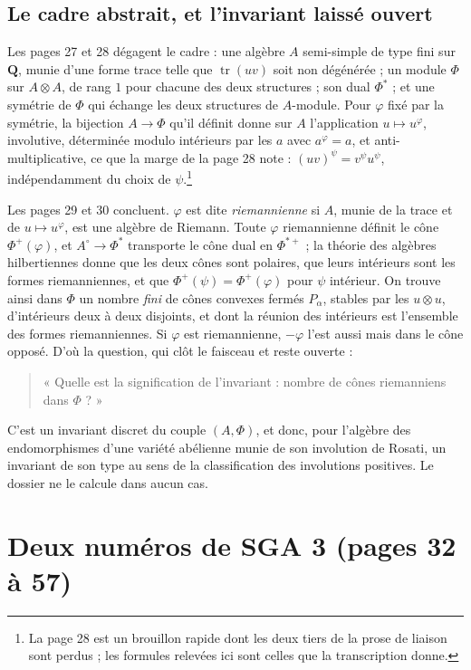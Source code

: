 \documentclass[11pt,a4paper]{article}
\begin{document}
\subsection*{Le cadre abstrait, et l'invariant laissé ouvert}

Les pages 27 et 28 dégagent le cadre : une algèbre $A$ semi-simple de type fini
sur $\mathbf{Q}$, munie d'une forme trace telle que $\operatorname{tr}(uv)$ soit
non dégénérée ; un module $\Phi$ sur $A \otimes A$, de rang $1$ pour chacune
des deux structures ; son dual $\Phi^{*}$ ; et une symétrie de $\Phi$ qui
échange les deux structures de $A$-module. Pour $\varphi$ fixé par la symétrie,
la bijection $A \to \Phi$ qu'il définit donne sur $A$ l'application $u \mapsto
u^{\varphi}$, involutive, déterminée modulo intérieurs par les $a$ avec
$a^{\varphi} = a$, et anti-multiplicative, ce que la marge de la page 28
note : $(uv)^{\psi} = v^{\psi}u^{\psi}$, indépendamment du choix de
$\psi$.\footnote{La page 28 est un brouillon rapide dont les deux tiers de la
prose de liaison sont perdus ; les formules relevées ici sont celles que la
transcription donne.}

Les pages 29 et 30 concluent. $\varphi$ est dite \emph{riemannienne} si $A$,
munie de la trace et de $u \mapsto u^{\varphi}$, est une algèbre de Riemann.
Toute $\varphi$ riemannienne définit le cône $\Phi^{+}(\varphi)$, et
$A^{\circ} \to \Phi^{*}$ transporte le cône dual en $\Phi^{*+}$ ; la théorie
des algèbres hilbertiennes donne que les deux cônes sont polaires, que leurs
intérieurs sont les formes riemanniennes, et que $\Phi^{+}(\psi) =
\Phi^{+}(\varphi)$ pour $\psi$ intérieur. On trouve ainsi dans $\Phi$ un nombre
\emph{fini} de cônes convexes fermés $P_{\alpha}$, stables par les $u \otimes
u$, d'intérieurs deux à deux disjoints, et dont la réunion des intérieurs est
l'ensemble des formes riemanniennes. Si $\varphi$ est riemannienne, $-\varphi$
l'est aussi mais dans le cône opposé. D'où la question, qui clôt le faisceau et
reste ouverte :
\begin{quote}
« Quelle est la signification de l'invariant : nombre de cônes riemanniens dans
$\Phi$ ? »
\end{quote}
C'est un invariant discret du couple $(A, \Phi)$, et donc, pour l'algèbre des
endomorphismes d'une variété abélienne munie de son involution de Rosati, un
invariant de son type au sens de la classification des involutions positives.
Le dossier ne le calcule dans aucun cas.

\section*{Deux numéros de SGA 3 (pages 32 à 57)}
\end{document}
